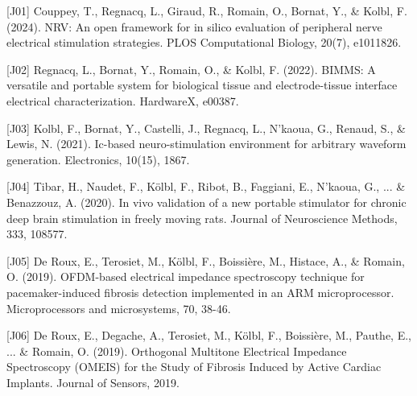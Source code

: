 


\begin{cvskills}
    \cvskill
      {[J01]} %
      {Couppey, T., Regnacq, L., Giraud, R., Romain, O., Bornat, Y., \& Kolbl, F. (2024). NRV: An open framework for in silico evaluation of peripheral nerve electrical stimulation strategies. PLOS Computational Biology, 20(7), e1011826.} %
  \end{cvskills}  
  \begin{cvskills}
    \cvskill
      {[J02]} %
      {Regnacq, L., Bornat, Y., Romain, O., \& Kolbl, F. (2022). BIMMS: A versatile and portable system for biological tissue and electrode-tissue interface electrical characterization. HardwareX, e00387.} %
  \end{cvskills}  
  \begin{cvskills}
    \cvskill
      {[J03]} %
      {Kolbl, F., Bornat, Y., Castelli, J., Regnacq, L., N’kaoua, G., Renaud, S., \& Lewis, N. (2021). Ic-based neuro-stimulation environment for arbitrary waveform generation. Electronics, 10(15), 1867.} %
  \end{cvskills}  
  \begin{cvskills}
    \cvskill
      {[J04]}
      {Tibar, H., Naudet, F., Kölbl, F., Ribot, B., Faggiani, E., N’kaoua, G., ... \& Benazzouz, A. (2020). In vivo validation of a new portable stimulator for chronic deep brain stimulation in freely moving rats. Journal of Neuroscience Methods, 333, 108577.}
  \end{cvskills}  
  \begin{cvskills}  
    \cvskill
      {[J05]}
      {De Roux, E., Terosiet, M., Kölbl, F., Boissière, M., Histace, A., \& Romain, O. (2019). OFDM-based electrical impedance spectroscopy technique for pacemaker-induced fibrosis detection implemented in an ARM microprocessor. Microprocessors and microsystems, 70, 38-46.}
  \end{cvskills}  
  \begin{cvskills}  
    \cvskill
      {[J06]}
      {De Roux, E., Degache, A., Terosiet, M., Kölbl, F., Boissière, M., Pauthe, E., ... \& Romain, O. (2019). Orthogonal Multitone Electrical Impedance Spectroscopy (OMEIS) for the Study of Fibrosis Induced by Active Cardiac Implants. Journal of Sensors, 2019.}
  \end{cvskills}  
